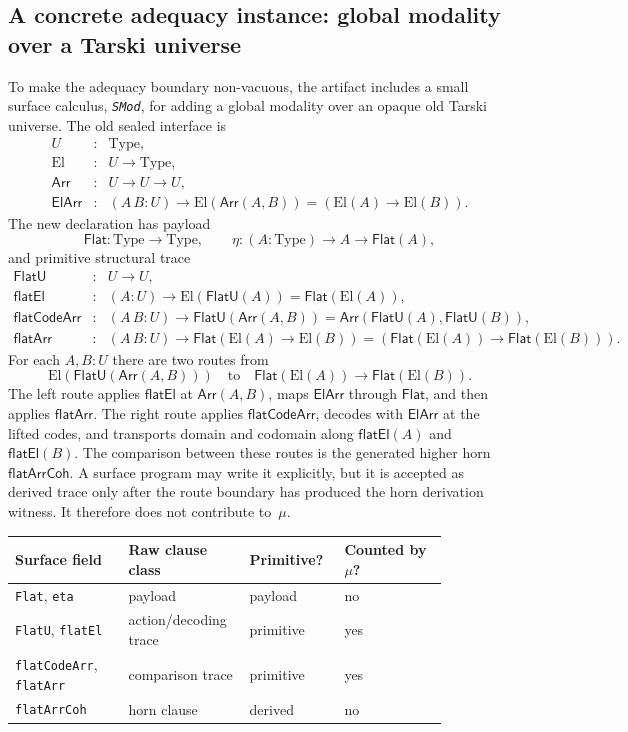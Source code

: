 \documentclass{lmcs}
\newcommand{\Type}{\mathrm{Type}}
\newcommand{\El}{\mathrm{El}}
\begin{document}
\subsection{A concrete adequacy instance: global modality over a Tarski universe}
\label{subsec:smod-adequacy}

To make the adequacy boundary non-vacuous, the artifact includes a small
surface calculus, \emph{\texttt{SMod}}, for adding a global modality over an
opaque old Tarski universe. The old sealed interface is
\[
\begin{array}{rcl}
  U&:&\Type,\\
  \El&:&U\to\Type,\\
  \mathsf{Arr}&:&U\to U\to U,\\
  \mathsf{ElArr}&:&(A\,B:U)\to
    \El(\mathsf{Arr}(A,B))=(\El(A)\to\El(B)).
\end{array}
\]
The new declaration has payload
\[
  \mathsf{Flat}:\Type\to\Type,
  \qquad
  \eta:(A:\Type)\to A\to\mathsf{Flat}(A),
\]
and primitive structural trace
\[
\begin{array}{rcl}
  \mathsf{FlatU}&:&U\to U,\\
  \mathsf{flatEl}&:&(A:U)\to
    \El(\mathsf{FlatU}(A))=\mathsf{Flat}(\El(A)),\\
  \mathsf{flatCodeArr}&:&(A\,B:U)\to
    \mathsf{FlatU}(\mathsf{Arr}(A,B))=
    \mathsf{Arr}(\mathsf{FlatU}(A),\mathsf{FlatU}(B)),\\
  \mathsf{flatArr}&:&(A\,B:U)\to
    \mathsf{Flat}(\El(A)\to\El(B))=
    (\mathsf{Flat}(\El(A))\to\mathsf{Flat}(\El(B))).
\end{array}
\]
For each $A,B:U$ there are two routes from
\[
  \El(\mathsf{FlatU}(\mathsf{Arr}(A,B)))
  \quad\text{to}\quad
  \mathsf{Flat}(\El(A))\to\mathsf{Flat}(\El(B)).
\]
The left route applies \(\mathsf{flatEl}\) at \(\mathsf{Arr}(A,B)\), maps
\(\mathsf{ElArr}\) through \(\mathsf{Flat}\), and then applies
\(\mathsf{flatArr}\). The right route applies \(\mathsf{flatCodeArr}\), decodes
with \(\mathsf{ElArr}\) at the lifted codes, and transports domain and codomain
along \(\mathsf{flatEl}(A)\) and \(\mathsf{flatEl}(B)\). The comparison between
these routes is the generated higher horn \(\mathsf{flatArrCoh}\). A surface
program may write it explicitly, but it is accepted as derived trace only
after the route boundary has produced the horn derivation witness. It therefore
does not contribute to~\(\mu\).

\begin{center}
\small
\begin{tabular}{@{}p{0.24\linewidth}p{0.22\linewidth}p{0.18\linewidth}p{0.22\linewidth}@{}}
\toprule
Surface field & Raw clause class & Primitive? & Counted by $\mu$? \\
\midrule
\texttt{Flat}, \texttt{eta} & payload & payload & no \\
\texttt{FlatU}, \texttt{flatEl} & action/decoding trace & primitive & yes \\
\texttt{flatCodeArr}, \texttt{flatArr} & comparison trace & primitive & yes \\
\texttt{flatArrCoh} & horn clause & derived & no \\
\bottomrule
\end{tabular}
\end{center}
\end{document}
